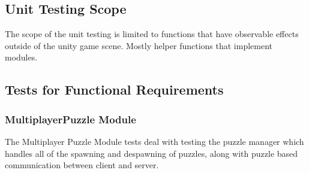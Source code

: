 \documentclass[12pt, titlepage]{article}
\begin{document}


\subsection{Unit Testing Scope}

The scope of the unit testing is limited to functions that have observable effects outside of the unity game scene. Mostly helper functions that implement modules.

\subsection{Tests for Functional Requirements}

\subsubsection{MultiplayerPuzzle Module}
The Multiplayer Puzzle Module tests deal with testing the puzzle manager which handles all of the spawning and despawning of puzzles, along with puzzle based communication between client and server. 
\end{document}
